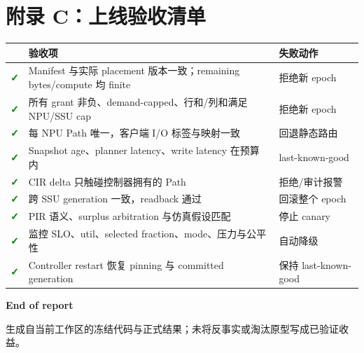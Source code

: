 \documentclass[UTF8,fontset=none,10pt,a4paper]{ctexart}
\newcommand{\good}{\textcolor{Green}{\bfseries ✓}}
\begin{document}
\section{附录 C：上线验收清单}

\begin{tabularx}{\textwidth}{p{9mm}Yp{38mm}}
\toprule
 & 验收项 & 失败动作\\
\midrule
\good & Manifest 与实际 placement 版本一致；remaining bytes/compute 均 finite & 拒绝新 epoch\\
\good & 所有 grant 非负、demand-capped、行和/列和满足 NPU/SSU cap & 拒绝新 epoch\\
\good & 每 NPU Path 唯一，客户端 I/O 标签与映射一致 & 回退静态路由\\
\good & Snapshot age、planner latency、write latency 在预算内 & last-known-good\\
\good & CIR delta 只触碰控制器拥有的 Path & 拒绝/审计报警\\
\good & 跨 SSU generation 一致，readback 通过 & 回滚整个 epoch\\
\good & PIR 语义、surplus arbitration 与仿真假设匹配 & 停止 canary\\
\good & 监控 SLO、util、selected fraction、mode、压力与公平性 & 自动降级\\
\good & Controller restart 恢复 pinning 与 committed generation & 保持 last-known-good\\
\bottomrule
\end{tabularx}

\vfill
\begin{center}
{\sffamily\bfseries\color{Navy}\large End of report}\par
{\small\color{Muted}生成自当前工作区的冻结代码与正式结果；未将反事实或淘汰原型写成已验证收益。}
\end{center}
\end{document}
